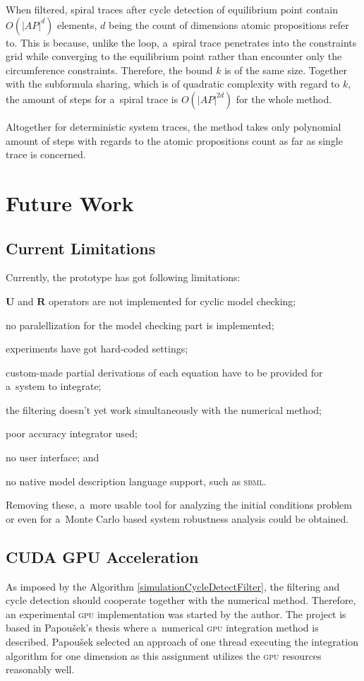 \documentclass[12pt,twoside,draft]{fithesis}
\newcommand{\bU}{\mathbf{U}}
\newcommand{\bR}{\mathbf{R}}
\begin{document}
When filtered, spiral traces after cycle detection of equilibrium point
contain $O(|AP|^d)$ elements, $d$ being the count of dimensions atomic
propositions refer to. This is because, unlike the loop, a~spiral trace
penetrates into the constraints grid while converging to the equilibrium
point rather than encounter only the circumference constraints.
Therefore, the bound $k$ is of the same size. Together with the
subformula sharing, which is of quadratic complexity with regard to $k$,
the amount of steps for a~spiral trace is $O(|AP|^{2d})$ for the whole
method.

Altogether for deterministic system traces, the method takes only
polynomial amount of steps with regards to the atomic propositions
count as far as single trace is concerned.

\chapter{Future Work}
\section{Current Limitations}
Currently, the prototype has got following limitations:
\begin{inparaenum}
\item $\bU$ and $\bR$ operators are not implemented for cyclic model
	checking;
\item no paralellization for the model checking part is implemented;
\item experiments have got hard-coded settings;
\item custom-made partial derivations of each equation have to be
	provided for a~system to integrate;
\item the filtering doesn't yet work simultaneously with the numerical
	method;
\item poor accuracy integrator used;
\item no user interface; and
\item no native model description language support, such as
	\textsc{sbml}\cite{sbml}.
\end{inparaenum}

Removing these, a~more usable tool for analyzing the initial conditions
problem\cite{sven} or even for a~Monte Carlo based system robustness
analysis\cite{rizk} could be obtained.

\section{CUDA GPU Acceleration}
As imposed by the Algorithm \ref{simulationCycleDetectFilter}, the
filtering and cycle detection should cooperate together with the
numerical method. Therefore, an experimental \textsc{gpu} implementation
was started by the author\cite{me:cuda}. The project is based in
Papou\v{s}ek's thesis\cite{papousek} where a~numerical \textsc{gpu}
integration method is described. Papou\v{s}ek selected an approach of
one thread executing the integration algorithm for one dimension as this
assignment utilizes the \textsc{gpu} resources reasonably
well\cite{papousek}.
\end{document}
